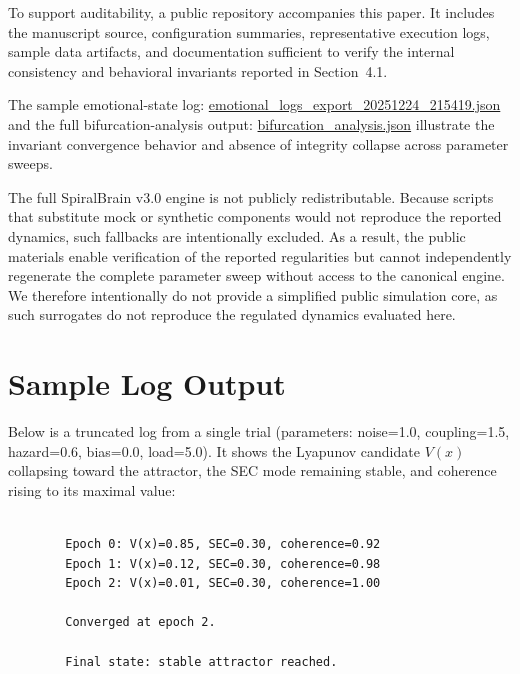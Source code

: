 \documentclass[11pt,a4paper]{article}
\begin{document}
To support auditability, a public repository accompanies this paper. It includes the manuscript source, configuration summaries, representative execution logs, sample data artifacts, and documentation sufficient to verify the internal consistency and behavioral invariants reported in Section~4.1. 

\begin{tcolorbox}
The sample emotional-state log:
\href{https://github.com/jhcragin/SpiralBrain-v3.0-public/blob/main/bifurcation_integrity_collapse/results/emotional_logs_export_20251224_215419.json}{emotional\_logs\_export\_20251224\_215419.json}
and the full bifurcation-analysis output:
\href{https://github.com/jhcragin/SpiralBrain-v3.0-public/blob/main/bifurcation_integrity_collapse/results/bifurcation_analysis_20260209_215839_complete_analysis.json}{bifurcation\_analysis.json}
illustrate the invariant convergence behavior and absence of integrity collapse across parameter sweeps.
\end{tcolorbox}

The full SpiralBrain v3.0 engine is not publicly redistributable. Because scripts that substitute mock or synthetic components would not reproduce the reported dynamics, such fallbacks are intentionally excluded. As a result, the public materials enable verification of the reported regularities but cannot independently regenerate the complete parameter sweep without access to the canonical engine. We therefore intentionally do not provide a simplified public simulation core, as such surrogates do not reproduce the regulated dynamics evaluated here.

\section{Sample Log Output}

Below is a truncated log from a single trial 
(parameters: noise=1.0, coupling=1.5, hazard=0.6, bias=0.0, load=5.0). 
It shows the Lyapunov candidate $V(x)$ collapsing toward the attractor, 
the SEC mode remaining stable, and coherence rising to its maximal value:

\begin{lstlisting}
        
        Epoch 0: V(x)=0.85, SEC=0.30, coherence=0.92
        Epoch 1: V(x)=0.12, SEC=0.30, coherence=0.98        
        Epoch 2: V(x)=0.01, SEC=0.30, coherence=1.00        
        
        Converged at epoch 2.
        
        Final state: stable attractor reached.
        
\end{lstlisting}
\end{document}
